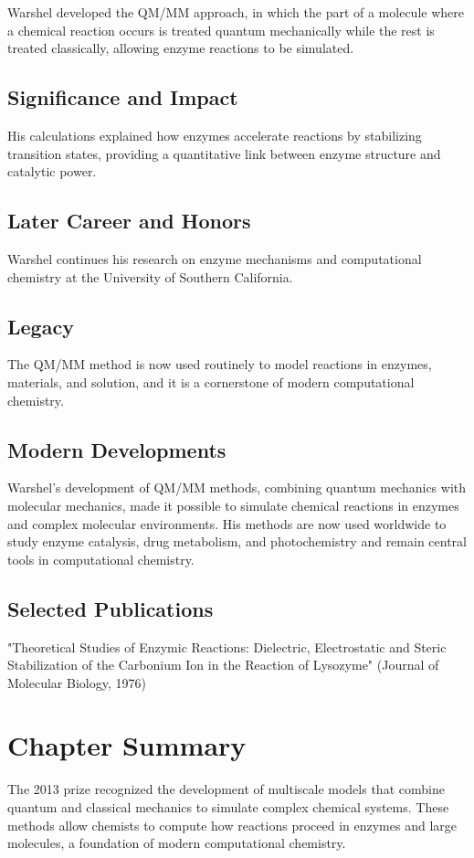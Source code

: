 Warshel developed the QM/MM approach, in which the part of a molecule where a chemical reaction occurs is treated quantum mechanically while the rest is treated classically, allowing enzyme reactions to be simulated.

\subsection*{Significance and Impact}

His calculations explained how enzymes accelerate reactions by stabilizing transition states, providing a quantitative link between enzyme structure and catalytic power.

\subsection*{Later Career and Honors}

Warshel continues his research on enzyme mechanisms and computational chemistry at the University of Southern California.

\subsection*{Legacy}

The QM/MM method is now used routinely to model reactions in enzymes, materials, and solution, and it is a cornerstone of modern computational chemistry.

\subsection*{Modern Developments}

Warshel's development of QM/MM methods, combining quantum mechanics with molecular mechanics, made it possible to simulate chemical reactions in enzymes and complex molecular environments. His methods are now used worldwide to study enzyme catalysis, drug metabolism, and photochemistry and remain central tools in computational chemistry.

\subsection*{Selected Publications}

"Theoretical Studies of Enzymic Reactions: Dielectric, Electrostatic and Steric Stabilization of the Carbonium Ion in the Reaction of Lysozyme" (Journal of Molecular Biology, 1976)

\clearpage

\section*{Chapter Summary}

The 2013 prize recognized the development of multiscale models that combine quantum and classical mechanics to simulate complex chemical systems. These methods allow chemists to compute how reactions proceed in enzymes and large molecules, a foundation of modern computational chemistry.
